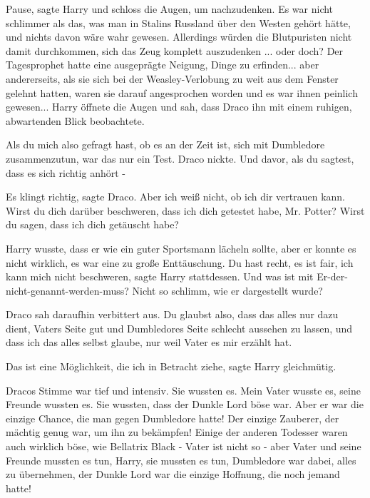 \glqq{}Pause\grqq{}, sagte Harry und schloss die Augen, um nachzudenken. Es war
nicht schlimmer als das, was man in Stalins Russland über den Westen gehört
hätte, und nichts davon wäre wahr gewesen. Allerdings würden die Blutpuristen
nicht damit durchkommen, sich das Zeug komplett auszudenken ... oder doch? Der
Tagesprophet hatte eine ausgeprägte Neigung, Dinge zu erfinden... aber
andererseits, als sie sich bei der Weasley-Verlobung zu weit aus dem Fenster
gelehnt hatten, waren sie darauf angesprochen worden und es war ihnen peinlich
gewesen... Harry öffnete die Augen und sah, dass Draco ihn mit einem ruhigen,
abwartenden Blick beobachtete.

\glqq{}Als du mich also gefragt hast, ob es an der Zeit ist, sich mit Dumbledore
zusammenzutun, war das nur ein Test.\grqq{} Draco nickte. \glqq{}Und davor, als
du sagtest, dass es sich richtig anhört -\grqq{}

\glqq{}Es klingt richtig\grqq{}, sagte Draco. \glqq{}Aber ich weiß nicht, ob ich
dir vertrauen kann. Wirst du dich darüber beschweren, dass ich dich getestet
habe, Mr. Potter? Wirst du sagen, dass ich dich getäuscht habe?\grqq{}

Harry wusste, dass er wie ein guter Sportsmann lächeln sollte, aber er konnte es
nicht wirklich, es war eine zu große Enttäuschung. \glqq{}Du hast recht, es ist
fair, ich kann mich nicht beschweren\grqq{}, sagte Harry stattdessen. \glqq{}Und
was ist mit Er-der-nicht-genannt-werden-muss? Nicht so schlimm, wie er
dargestellt wurde?\grqq{}

Draco sah daraufhin verbittert aus. \glqq{}Du glaubst also, dass das alles nur
dazu dient, Vaters Seite gut und Dumbledores Seite schlecht aussehen zu lassen,
und dass ich das alles selbst glaube, nur weil Vater es mir erzählt hat.\grqq{}

\glqq{}Das ist eine Möglichkeit, die ich in Betracht ziehe\grqq{}, sagte Harry
gleichmütig.

Dracos Stimme war tief und intensiv. \glqq{}Sie wussten es. Mein Vater wusste es,
seine Freunde wussten es. Sie wussten, dass der Dunkle Lord böse war. Aber er
war die einzige Chance, die man gegen Dumbledore hatte! Der einzige Zauberer,
der mächtig genug war, um ihn zu bekämpfen! Einige der anderen Todesser waren
auch wirklich böse, wie Bellatrix Black - Vater ist nicht so - aber Vater und
seine Freunde mussten es tun, Harry, sie mussten es tun, Dumbledore war dabei,
alles zu übernehmen, der Dunkle Lord war die einzige Hoffnung, die noch jemand
hatte!\grqq{}

